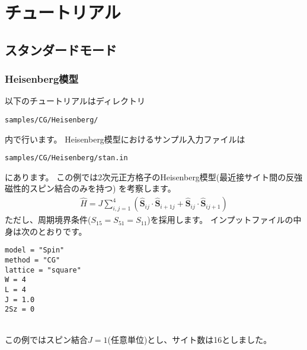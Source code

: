 \chapter{チュートリアル}
\label{Ch:model}
\section{スタンダードモード}
\label{Sec:StandardMode}

\subsection{Heisenberg模型}

以下のチュートリアルはディレクトリ
\begin{verbatim}
samples/CG/Heisenberg/
\end{verbatim}
内で行います。
Heisenberg模型におけるサンプル入力ファイルは
\begin{verbatim}
samples/CG/Heisenberg/stan.in
\end{verbatim}
にあります。
この例では2次元正方格子のHeisenberg模型(最近接サイト間の反強磁性的スピン結合のみを持つ)
を考察します。
\begin{align}
  {\hat H} = J \sum_{i,j=1}^{4}(
  {\hat {\boldsymbol S}}_{i j} \cdot {\hat {\boldsymbol S}}_{i+1 j} +
  {\hat {\boldsymbol S}}_{i j} \cdot {\hat {\boldsymbol S}}_{i j+1}
  )
\end{align}
ただし、周期境界条件($S_{1 5} = S_{5 1}= S_{1 1}$)を採用します。
インプットファイルの中身は次のとおりです。
\\
\begin{minipage}{10cm}
\begin{screen}
\begin{verbatim}
model = "Spin"
method = "CG"
lattice = "square"
W = 4
L = 4
J = 1.0
2Sz = 0
\end{verbatim}
\end{screen}
\end{minipage}
%
\\
この例ではスピン結合$J=1$(任意単位)とし、サイト数は16としました。

